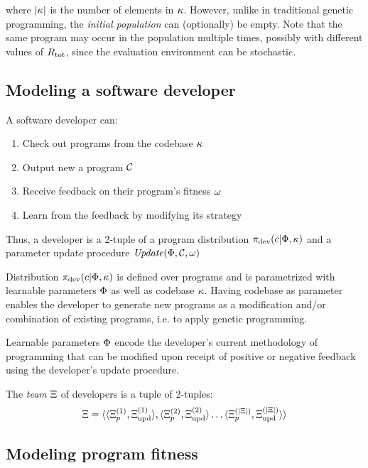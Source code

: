 where $|\kappa|$ is the number of elements in $\kappa$.
However, unlike in traditional genetic programming, the \emph{initial population} can (optionally) be empty.
Note that the same program may occur in the population multiple times, possibly with different values of $R_\text{tot}$, since the evaluation environment can be stochastic.

\subsection{Modeling a software developer}
\label{sec:developer}

A software developer can:
\begin{enumerate}
    \item Check out programs from the codebase $\kappa$
    \item Output new a program $\mathcal{C}$
    \item Receive feedback on their program's fitness $\omega$ 
    \item Learn from the feedback by modifying its strategy
\end{enumerate}

Thus, a developer is a 2-tuple of a program distribution $\pi_\text{dev}(c | \Phi, \kappa)$ and a parameter update procedure $\mathit{Update}(\Phi, \mathcal{C}, \omega)$

Distribution $\pi_{\text{dev}}(c | \Phi, \kappa)$ is defined over programs and is parametrized with learnable parameters $\Phi$ as well as codebase $\kappa$. 
Having codebase as parameter enables the developer to generate new programs as a modification and/or combination of existing programs, i.e. to apply genetic programming.

Learnable parameters $\Phi$ encode the developer's current methodology of programming that can be modified upon receipt of positive or negative feedback using the developer's update procedure. 

The \emph{team} $\Xi$ of developers is a tuple of 2-tuples:
\begin{equation}
    \Xi = \langle \langle \Xi_p^{(1)}, \Xi_\text{upd}^{(1)} \rangle, \langle \Xi_p^{(2)}, \Xi_\text{upd}^{(2)} \rangle \dots \langle \Xi_p^{(|\Xi|)}, \Xi_\text{upd}^{(|\Xi|)} \rangle \rangle
\end{equation}

\newpage \subsection{Modeling program fitness}
\label{sec:fitness}


